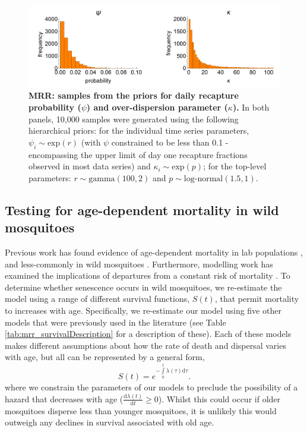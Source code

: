 \documentclass[12pt]{article}
\begin{document}
\begin{figure}[h]
	\centerline{\includegraphics[width=1\textwidth]{./Figure_files/mrr_priors_PsiKappa.pdf}}
	\caption{\textbf{MRR: samples from the priors for daily recapture probability ($\psi$) and over-dispersion parameter ($\kappa$).} In both panels, 10,000 samples were generated using the following hierarchical priors: for the individual time series parameters, $\psi_i \sim \text{exp}(r)$ (with $\psi$ constrained to be less than 0.1 - encompassing the upper limit of day one recapture fractions observed in most data series) and $\kappa_i \sim \text{exp}(p)$; for the top-level parameters: $r\sim \text{gamma}(100, 2)$ and $p\sim \text{log-normal}(1.5, 1)$.}\label{fig:mrr_PsiKappaPriors}
\end{figure}

\subsection{Testing for age-dependent mortality in wild mosquitoes}\label{sec:mrr_age_dependence}
Previous work has found evidence of age-dependent mortality in lab populations \citep{styer2007mosquitoes,dawes2009anopheles}, and less-commonly in wild mosquitoes \citep{clements1981analysis,harrington2008age}. Furthermore, modelling work has examined the implications of departures from a constant risk of mortality \citep{styer2007mosquitoes,hancock2009age,novoseltsev2012age}. To determine whether senescence occurs in wild mosquitoes, we re-estimate the model using a range of different survival functions, $S(t)$, that permit mortality to increases with age. Specifically, we re-estimate our model using five other models that were previously used in the literature (see Table \ref{tab:mrr_survivalDescription} for a description of these). Each of these models makes different assumptions about how the rate of death and dispersal varies with age, but all can be represented by a general form,
%
\begin{equation}\label{eq:survivalInt}
S(t) = e^{-\int\limits_{0}^{t}\lambda(\tau) \mathrm{d}\tau}.
\end{equation}
%
where we constrain the parameters of our models to preclude the possibility of a hazard that decreases with age ($\frac{\mathrm{d}\lambda(t)}{\mathrm{d}t} \geq 0$). Whilst this could occur if older mosquitoes disperse less than younger mosquitoes, it is unlikely this would outweigh any declines in survival associated with old age.
\end{document}
